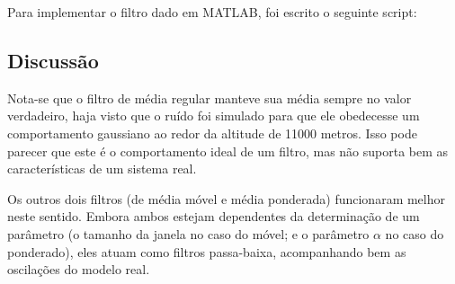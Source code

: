 \documentclass[12pt, a4paper, twoside]{article}
\begin{document}
Para implementar o filtro dado em MATLAB, foi escrito o seguinte script:


\subsection{Discussão}

Nota-se que o filtro de média regular manteve sua média sempre no valor verdadeiro, haja visto que o ruído foi simulado para que ele obedecesse um comportamento gaussiano ao redor da altitude de 11000 metros. Isso pode parecer que este é o comportamento ideal de um filtro, mas não suporta bem as características de um sistema real.

Os outros dois filtros (de média móvel e média ponderada) funcionaram melhor neste sentido. Embora ambos estejam dependentes da determinação de um parâmetro (o tamanho da janela no caso do móvel; e o parâmetro $\alpha$ no caso do ponderado), eles atuam como filtros passa-baixa, acompanhando bem as oscilações do modelo real.
\end{document}
